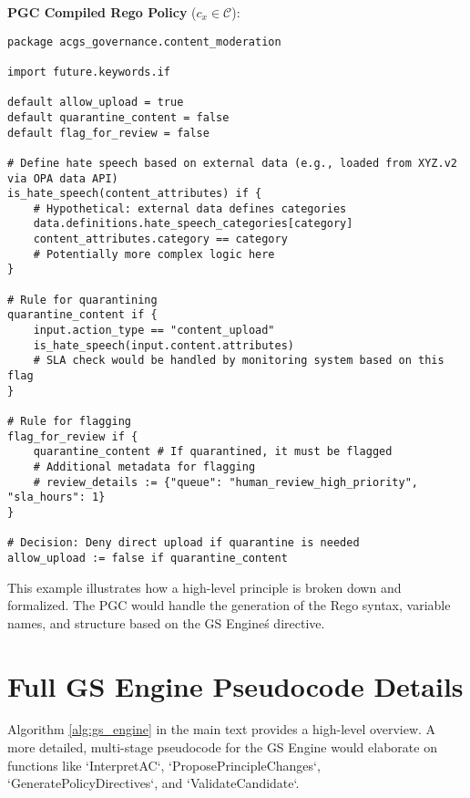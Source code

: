 \documentclass[sigconf,review,screen]{acmart}
\begin{document}
\textbf{PGC Compiled Rego Policy} ($c_x \in \mathcal{C}$):
\begin{lstlisting}[caption={PGC Compiled Rego Policy Example},label={lst:rego_policy},basicstyle=\ttfamily\footnotesize,breaklines=true,keepspaces=true]
package acgs_governance.content_moderation

import future.keywords.if

default allow_upload = true
default quarantine_content = false
default flag_for_review = false

# Define hate speech based on external data (e.g., loaded from XYZ.v2 via OPA data API)
is_hate_speech(content_attributes) if {
    # Hypothetical: external data defines categories
    data.definitions.hate_speech_categories[category]
    content_attributes.category == category
    # Potentially more complex logic here
}

# Rule for quarantining
quarantine_content if {
    input.action_type == "content_upload"
    is_hate_speech(input.content.attributes)
    # SLA check would be handled by monitoring system based on this flag
}

# Rule for flagging
flag_for_review if {
    quarantine_content # If quarantined, it must be flagged
    # Additional metadata for flagging
    # review_details := {"queue": "human_review_high_priority", "sla_hours": 1}
}

# Decision: Deny direct upload if quarantine is needed
allow_upload := false if quarantine_content
\end{lstlisting}
This example illustrates how a high-level principle is broken down and formalized. The PGC would handle the generation of the Rego syntax, variable names, and structure based on the GS Engine\'s directive.

\section{Full GS Engine Pseudocode Details}
\label{app:gs_engine_full_pseudo}
Algorithm \ref{alg:gs_engine} in the main text provides a high-level overview. A more detailed, multi-stage pseudocode for the GS Engine would elaborate on functions like `InterpretAC`, `ProposePrincipleChanges`, `GeneratePolicyDirectives`, and `ValidateCandidate`.
\end{document}
